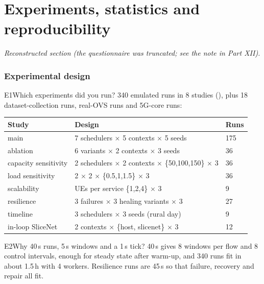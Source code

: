\part{Experiments, statistics and reproducibility}
\textit{Reconstructed section (the questionnaire was truncated; see the note in Part XII).}

\section{Experimental design}

\begin{qa}{E1}{Which experiments did you run?}
340 emulated runs in 8 studies (), plus 18 dataset-collection runs, real-OVS
runs and 5G-core runs:
\begin{center}\scriptsize
\begin{tabular}{@{}lll@{}}\toprule
Study & Design & Runs \\\midrule
main & 7 schedulers $\times$ 5 contexts $\times$ 5 seeds & 175 \\
ablation & 6 variants $\times$ 2 contexts $\times$ 3 seeds & 36 \\
capacity sensitivity & 2 schedulers $\times$ 2 contexts $\times$ \{50,100,150\} $\times$ 3 & 36 \\
load sensitivity & 2 $\times$ 2 $\times$ \{0.5,1,1.5\} $\times$ 3 & 36 \\
scalability & UEs per service \{1,2,4\} $\times$ 3 & 9 \\
resilience & 3 failures $\times$ 3 healing variants $\times$ 3 & 27 \\
timeline & 3 schedulers $\times$ 3 seeds (rural day) & 9 \\
in-loop SliceNet & 2 contexts $\times$ \{host, slicenet\} $\times$ 3 & 12 \\\bottomrule
\end{tabular}\end{center}
\end{qa}

\begin{qa}{E2}{Why 40\,s runs, 5\,s windows and a 1\,s tick?}
40\,s gives 8 windows per flow and 8 control intervals, enough for steady state after warm-up, and 340 runs fit in
about 1.5\,h with 4 workers. Resilience runs are 45\,s so that failure, recovery and repair all fit.
\end{qa}

